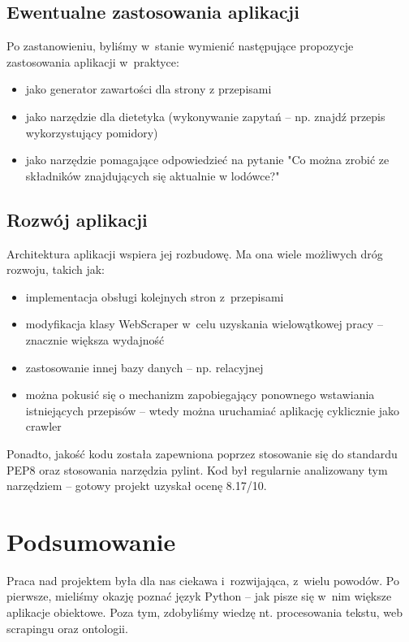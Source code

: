 \documentclass[11pt,a4paper]{article}
\begin{document}
\subsection{Ewentualne zastosowania aplikacji}
Po zastanowieniu, byliśmy w~stanie wymienić następujące propozycje zastosowania aplikacji w~praktyce:
\begin{itemize}
  \item jako generator zawartości dla strony z przepisami
  \item jako narzędzie dla dietetyka (wykonywanie zapytań -- np. znajdź przepis wykorzystujący pomidory)
  \item jako narzędzie pomagające odpowiedzieć na pytanie "Co można zrobić ze składników znajdujących się aktualnie w lodówce?"
\end{itemize}

\subsection{Rozwój aplikacji}
Architektura aplikacji wspiera jej rozbudowę. Ma ona wiele możliwych dróg rozwoju, takich jak:

\begin{itemize}
  \item implementacja obsługi kolejnych stron z~przepisami
  \item modyfikacja klasy WebScraper w~celu uzyskania wielowątkowej pracy -- znacznie większa wydajność
  \item zastosowanie innej bazy danych -- np. relacyjnej
  \item można pokusić się o mechanizm zapobiegający ponownego wstawiania istniejących przepisów -- wtedy można uruchamiać aplikację cyklicznie jako crawler
\end{itemize}

Ponadto, jakość kodu została zapewniona poprzez stosowanie się do standardu PEP8 oraz stosowania narzędzia pylint. Kod był regularnie analizowany tym narzędziem -- gotowy projekt uzyskał ocenę 8.17/10.

\section{Podsumowanie}
Praca nad projektem była dla nas ciekawa i~rozwijająca, z~wielu powodów. Po pierwsze, mieliśmy okazję poznać język Python -- jak pisze się w~nim większe aplikacje obiektowe. Poza tym, zdobyliśmy wiedzę nt. procesowania tekstu, web scrapingu oraz ontologii.

%
\end{document}
